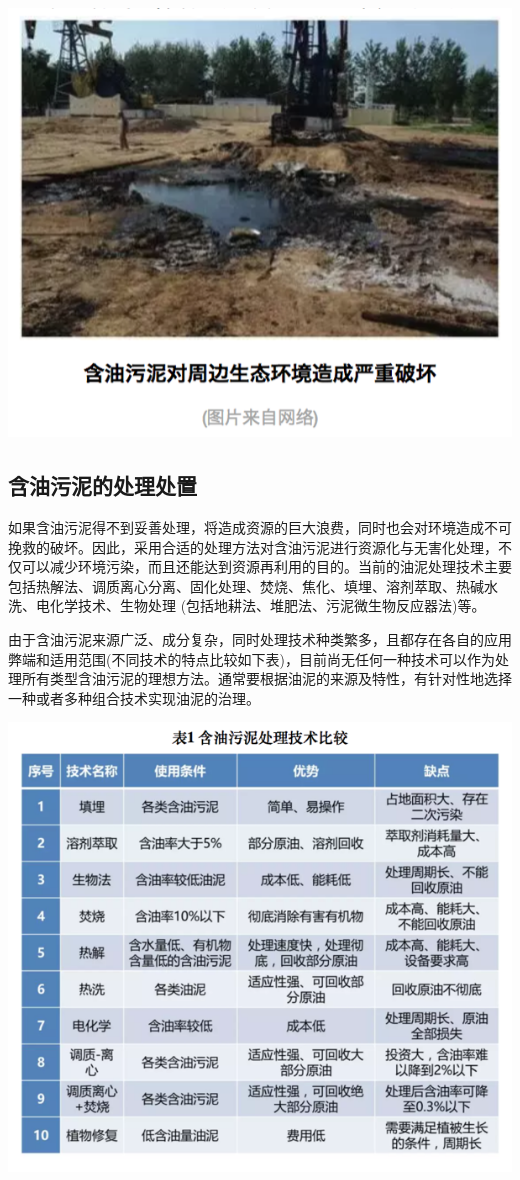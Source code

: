 \documentclass[]{book}
\begin{document}
\includegraphics[width=8.33in]{images/youni8}

\hypertarget{ux542bux6cb9ux6c61ux6ce5ux7684ux5904ux7406ux5904ux7f6e}{%
\subsection{含油污泥的处理处置}\label{ux542bux6cb9ux6c61ux6ce5ux7684ux5904ux7406ux5904ux7f6e}}

如果含油污泥得不到妥善处理，将造成资源的巨大浪费，同时也会对环境造成不可挽救的破坏。因此，采用合适的处理方法对含油污泥进行资源化与无害化处理，不仅可以减少环境污染，而且还能达到资源再利用的目的。当前的油泥处理技术主要包括热解法、调质离心分离、固化处理、焚烧、焦化、填埋、溶剂萃取、热碱水洗、电化学技术、生物处理 (包括地耕法、堆肥法、污泥微生物反应器法)等。

由于含油污泥来源广泛、成分复杂，同时处理技术种类繁多，且都存在各自的应用弊端和适用范围(不同技术的特点比较如下表)，目前尚无任何一种技术可以作为处理所有类型含油污泥的理想方法。通常要根据油泥的来源及特性，有针对性地选择一种或者多种组合技术实现油泥的治理。

\includegraphics[width=8.33in]{images/youni9}
\end{document}
